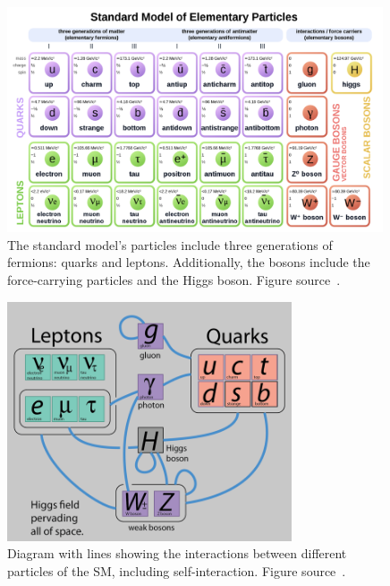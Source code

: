

\begin{figure}[t!]
\centering
\includegraphics[width=0.99\textwidth]{figures/SM_include_antimatter.png}
\caption[The particles of the SM]{The standard model's particles include three generations of fermions: quarks and leptons. Additionally, the bosons include the force-carrying particles and the Higgs boson. Figure source~\cite{SMtable}.
\label{fig:SMParticles}}
\end{figure}

\begin{figure}[t!]
\centering
\includegraphics[width=0.75\textwidth]{figures/interactions_SM.png}
\caption[The SM particles and their interactions]{Diagram with lines showing the interactions between different particles of the SM, including self-interaction. Figure source~\cite{Particle_interactions}.
\label{fig:SMinteractions}}
\end{figure}

